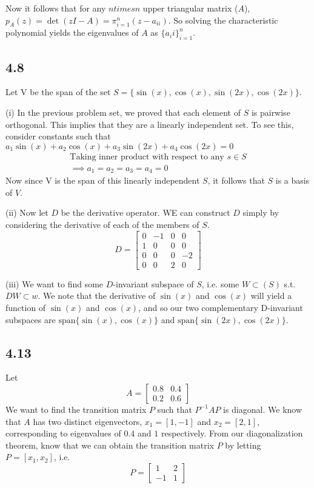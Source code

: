 \documentclass{article}
\begin{document}
	Now it follows that for any $n times n$ upper triangular matrix ($A$), $p_A(z) = \det(zI - A) = \pi_{i=1}^{n}  (z - a_{ii})$. So solving the characteristic polynomial yields the eigenvalues of $A$ as $\{ a_ii\}_{i=1}^{n}$. 
	
	\subsection*{4.8}
	Let V be the span of the set $S = \{ \sin(x) , \cos(x), \sin(2x), \cos(2x) \}$.
	
	(i) In the previous problem set, we proved that each element of $S$ is pairwise orthogonal. This implies that they are a linearly independent set. To see this, consider constants such that $a_1 \sin(x) + a_2 \cos(x) + a_3 \sin(2x) + a_4 \cos(2x) = 0$
	\begin{align*}
	\text{Taking inner product with respect to any } s \in S \\
	\implies a_1 = a_2 = a_3 = a_4 = 0
	\end{align*}
	Now since V is the span of this linearly independent $S$, it follows that $S$ is a basis of $V$.
	
	(ii) Now let $D$ be the derivative operator. WE can construct $D$ simply by considering the derivative of each of the members of $S$.
	\[ D = \begin{bmatrix} 0 & -1 & 0 & 0 \\ 1 & 0 & 0 & 0 \\ 0 & 0 & 0 & -2 \\ 0 & 0 & 2 & 0 \end{bmatrix} \]
	
	(iii) We want to find some $D$-invariant subspace of $S$, i.e. some $W \subset(S)$ s.t. $DW \subset w$. We note that the derivative of $\sin(x) $ and $\cos(x)$ will yield a function of $\sin(x)$ and $\cos(x)$, and so our two complementary D-invariant subspaces are $\text{span}\{\sin(x), \cos(x)\}$ and $\text{span}\{\sin(2x), \cos(2x)\}$.
	
	\subsection*{4.13}
	Let
	\[ A = \begin{bmatrix} 0.8 & 0.4 \\ 0.2 & 0.6 \end{bmatrix} \]
	We want to find the transition matrix $P$ such that $P^{-1} A P$ is diagonal. We know that $A$ has two distinct eigenvectors, $x_1 = [1,-1]$ and $x_2 = [2,1]$, corresponding to eigenvalues of $0.4$ and $1$ respectively. From our diagonalization theorem, know that we can obtain the transition matrix $P$ by letting $P = [x_1, x_2]$, i.e.
	\[ P = \begin{bmatrix} 1 & 2 \\ -1 & 1\end{bmatrix}\]
	
\end{document}
